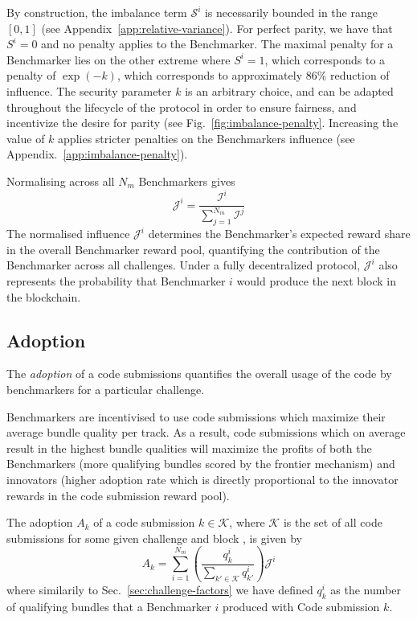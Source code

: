 \documentclass{contract}
\numberwithin{equation}{section}
\begin{document}
By construction, the imbalance term $\mathcal{S}^i$ is necessarily bounded in the range $[0,1]$ (see Appendix~\ref{app:relative-variance}). For perfect parity, we have that $S^i = 0$ and no penalty applies to the Benchmarker. 
The maximal penalty for a Benchmarker lies on the other extreme where $S^i = 1$, which corresponds to a penalty of $\exp(-k)$, which corresponds to approximately 86\% reduction of influence. 
The security parameter $k$ is an arbitrary choice, and can be adapted throughout the lifecycle of the protocol in order to ensure fairness, and incentivize the desire for parity (see Fig.~\ref{fig:imbalance-penalty}. 
Increasing the value of $k$ applies stricter penalties on the Benchmarkers influence (see Appendix.~\ref{app:imbalance-penalty}). 


Normalising across all $N_m$ Benchmarkers gives 
\begin{equation}
    \mathcal{J}^i = \frac{\mathcal{I}^i}{\sum_{j=1}^{N_m} \mathcal{I}^j}
\end{equation}
The normalised influence $\mathcal{J}^i$ determines the Benchmarker's expected reward share in the overall Benchmarker reward pool, quantifying the contribution of the Benchmarker across all challenges.
Under a fully decentralized protocol, $\mathcal{J}^i$ also represents the probability that Benchmarker $i$ would produce the next block in the blockchain.   
\subsection{Adoption}

The \emph{adoption} of a code submissions quantifies the overall usage of the code by benchmarkers for a particular challenge.

Benchmarkers are incentivised to use code submissions which maximize their average bundle quality per track. 
As a result, code submissions which on average result in the highest bundle qualities will maximize the profits of both the Benchmarkers (more qualifying bundles scored by the frontier mechanism) and innovators (higher adoption rate which is directly proportional to the innovator rewards in the code submission reward pool). 

The adoption $A_k$ of a code submission $k \in \mathcal{K}$, where $\mathcal{K}$ is the set of all code submissions for some given challenge and block , is given by
\begin{equation}
    A_k = \sum_{i=1}^{N_m}\left( \frac{q^i_k}{\sum_{k'\in\mathcal{K}}q^i_{k'}}\right)\mathcal{J}^i
\end{equation}
where similarily to Sec.~\ref{sec:challenge-factors} we have defined $q^i_k$ as the number of qualifying bundles that a Benchmarker $i$ produced with Code submission $k$. 
\end{document}
